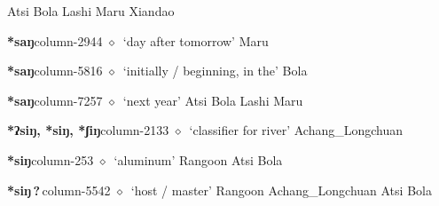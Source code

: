 \hspace{1ex}
         Atsi 
\hspace{1ex}
         Bola 
\hspace{1ex}
         Lashi 
\hspace{1ex}
         Maru 
\hspace{1ex}
         Xiandao 
  \item {\footnotesize \textbf{*saŋ}}{\tiny column-2944}
         $\diamond$~`day after tomorrow'
         Maru 
  \item {\footnotesize \textbf{*saŋ}}{\tiny column-5816}
         $\diamond$~`initially / beginning, in the'
         Bola 
  \item {\footnotesize \textbf{*saŋ}}{\tiny column-7257}
         $\diamond$~`next year'
         Atsi 
\hspace{1ex}
         Bola 
\hspace{1ex}
         Lashi 
\hspace{1ex}
         Maru 
  \item {\footnotesize \textbf{*ʔsiŋ, *siŋ, *ʃiŋ}}{\tiny column-2133}
         $\diamond$~`classifier for river'
         Achang\_Longchuan 
  \item {\footnotesize \textbf{*siŋ}}{\tiny column-253}
         $\diamond$~`aluminum'
         Rangoon 
\hspace{1ex}
         Atsi 
\hspace{1ex}
         Bola 
  \item {\footnotesize \textbf{*siŋ\,?\,}}{\tiny column-5542}
         $\diamond$~`host / master'
         Rangoon 
\hspace{1ex}
         Achang\_Longchuan 
\hspace{1ex}
         Atsi 
\hspace{1ex}
         Bola 
